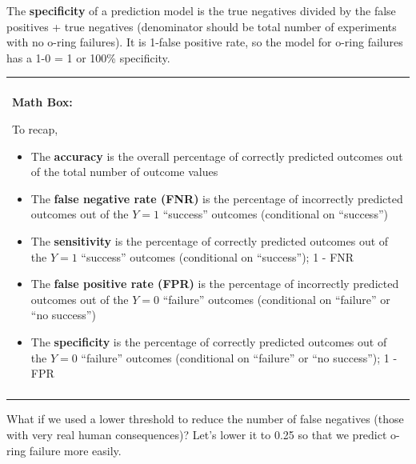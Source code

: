 \documentclass[
]{book}
\newenvironment{Shaded}{\begin{snugshade}}{\end{snugshade}}
\newcommand{\CommentTok}[1]{\textcolor[rgb]{0.56,0.35,0.01}{\textit{#1}}}
\newcommand{\DataTypeTok}[1]{\textcolor[rgb]{0.13,0.29,0.53}{#1}}
\newcommand{\FloatTok}[1]{\textcolor[rgb]{0.00,0.00,0.81}{#1}}
\newcommand{\KeywordTok}[1]{\textcolor[rgb]{0.13,0.29,0.53}{\textbf{#1}}}
\newcommand{\NormalTok}[1]{#1}
\newcommand{\OperatorTok}[1]{\textcolor[rgb]{0.81,0.36,0.00}{\textbf{#1}}}
\newcommand{\StringTok}[1]{\textcolor[rgb]{0.31,0.60,0.02}{#1}}
\newenvironment{mathbox}
{
    \begin{center}
    
    \begin{tabular}{|p{0.8\textwidth}|}
    \rowcolor{LightYellow}
    \hline\\
    \rowcolor{LightYellow}
    \textbf{Math Box:}
}
{
    \\\rowcolor{LightYellow}
    \\\hline
    \end{tabular} 
    \end{center}
}
\begin{document}
The \textbf{specificity} of a prediction model is the true negatives divided by the false positives + true negatives (denominator should be total number of experiments with no o-ring failures). It is 1-false positive rate, so the model for o-ring failures has a 1-0 = 1 or 100\% specificity.

\begin{mathbox}
To recap,

\begin{itemize}
\item
  The \textbf{accuracy} is the overall percentage of correctly predicted
  outcomes out of the total number of outcome values
\item
  The \textbf{false negative rate (FNR)} is the percentage of
  incorrectly predicted outcomes out of the \(Y=1\) ``success'' outcomes
  (conditional on ``success'')
\item
  The \textbf{sensitivity} is the percentage of correctly predicted
  outcomes out of the \(Y=1\) ``success'' outcomes (conditional on
  ``success''); 1 - FNR
\item
  The \textbf{false positive rate (FPR)} is the percentage of
  incorrectly predicted outcomes out of the \(Y=0\) ``failure'' outcomes
  (conditional on ``failure'' or ``no success'')
\item
  The \textbf{specificity} is the percentage of correctly predicted
  outcomes out of the \(Y=0\) ``failure'' outcomes (conditional on
  ``failure'' or ``no success''); 1 - FPR
\end{itemize}
\end{mathbox}

What if we used a lower threshold to reduce the number of false negatives (those with very real human consequences)? Let's lower it to 0.25 so that we predict o-ring failure more easily.

\begin{Shaded}
\end{Shaded}
\end{document}

